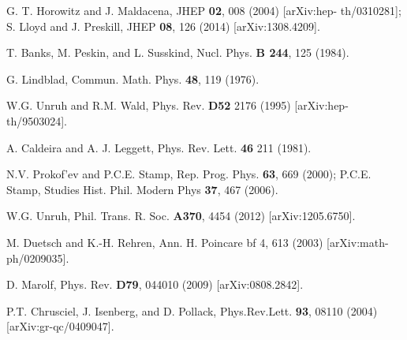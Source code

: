 \documentclass[12pt,nofootinbib,amsmath,amssymb,amsfonts,aps,prd,groupedaddress]{revtex4-1}
\begin{document}
\begin{thebibliography}{99}
G. T. Horowitz and J. Maldacena, JHEP {\bf 02}, 008 (2004) [arXiv:hep-
th/0310281]; S. Lloyd and J. Preskill, JHEP {\bf 08}, 126 (2014)  [arXiv:1308.4209].

T. Banks, M. Peskin, and L. Susskind, Nucl. Phys. {\bf B 244}, 125 (1984).

G. Lindblad, Commun. Math. Phys. {\bf 48}, 119 (1976).

W.G. Unruh and R.M. Wald, Phys. Rev. {\bf D52} 2176 (1995) [arXiv:hep-th/9503024]. 

A. Caldeira and A. J. Leggett, Phys. Rev. Lett. {\bf 46} 211 (1981).

N.V. Prokof'ev and P.C.E. Stamp, Rep. Prog. Phys. {\bf 63}, 669 (2000); P.C.E. Stamp, Studies Hist. Phil. Modern Phys {\bf 37}, 467 (2006).

W.G. Unruh, Phil. Trans. R. Soc. {\bf A370}, 4454 (2012) [arXiv:1205.6750].

M. Duetsch and K.-H. Rehren, Ann. H. Poincare {bf 4}, 613 (2003) [arXiv:math-ph/0209035].

D. Marolf, Phys. Rev. {\bf D79}, 044010 (2009) [arXiv:0808.2842].

P.T. Chrusciel, J. Isenberg, and D. Pollack, Phys.Rev.Lett. {\bf 93}, 08110 (2004) [arXiv:gr-qc/0409047].

\end{thebibliography}
\end{document}

